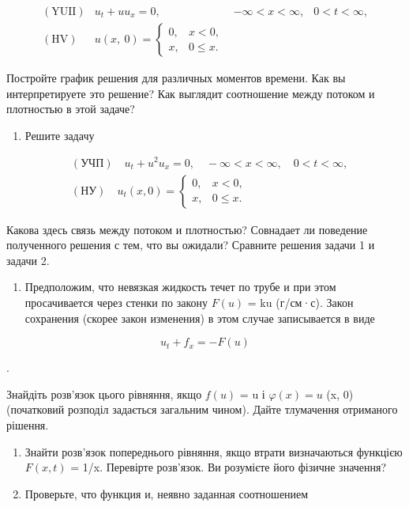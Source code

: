 \documentclass[
  ukrainian,
]{article}
\providecommand{\tightlist}{%
  \setlength{\itemsep}{0pt}\setlength{\parskip}{0pt}}
\begin{document}
\[
\begin{array}{lll} (\text{YUII}) & u_t + uu_x = 0, & -\infty < x < \infty, & 0 < t < \infty, \\ (\text{HV}) & u(x, \ 0) = \begin{cases} 0, & x < 0, \\ x, & 0 \leqslant x. \end{cases} \end{array}
\]

Постройте график решения для различных моментов времени. Как вы
интерпретируете это решение? Как выглядит соотношение между потоком и
плотностью в этой задаче?

\begin{enumerate}
\def\labelenumi{\arabic{enumi}.}
\setcounter{enumi}{1}
\tightlist
\item
  Решите задачу
\end{enumerate}

\[
\begin{split} & (\text{УЧП}) \quad u_t + u^2 u_x = 0, \quad -\infty < x < \infty, \quad 0 < t < \infty, \\ & (\text{НУ}) \quad u_t(x, 0) = \begin{cases} 0, & x < 0, \\ x, & 0 \leqslant x. \end{cases} \end{split}
\]

Какова здесь связь между потоком и плотностью? Совнадает ли поведение
полученного решения с тем, что вы ожидали? Сравните решения задачи 1 и
задачи 2.

\begin{enumerate}
\def\labelenumi{\arabic{enumi}.}
\setcounter{enumi}{2}
\tightlist
\item
  Предположим, что невязкая жидкость течет по трубе и при этом
  просачивается через стенки по закону \(F(u)\) = ku (г/см·с). Закон
  сохранения (скорее закон изменения) в этом случае записывается в виде
\end{enumerate}

\[
u_t + f_x = -F(u)
\]

.

Знайдіть розв'язок цього рівняння, якщо \(f(u)\) = u і
\(\varphi(x) = u\) (x, 0) (початковий розподіл задається загальним
чином). Дайте тлумачення отриманого рішення.

\begin{enumerate}
\def\labelenumi{\arabic{enumi}.}
\setcounter{enumi}{3}
\item
  Знайти розв'язок попереднього рівняння, якщо втрати визначаються
  функцією \(F(x, t)\) = 1/x. Перевірте розв'язок. Ви розумієте його
  фізичне значення?
\item
  Проверьте, что функция и, неявно заданная соотношением
\end{enumerate}
\end{document}
